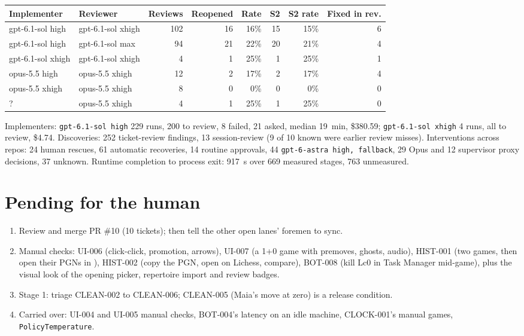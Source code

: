 \documentclass[11pt,a4paper]{article}
\begin{document}
{\small
\begin{tabular}{@{}llrrrrrr@{}}
\toprule
Implementer & Reviewer & Reviews & Reopened & Rate & S2 & S2 rate & Fixed in rev. \\
\midrule
gpt-6.1-sol high & gpt-6.1-sol xhigh & 102 & 16 & 16\% & 15 & 15\% & 6 \\
gpt-6.1-sol high & gpt-6.1-sol max & 94 & 21 & 22\% & 20 & 21\% & 4 \\
gpt-6.1-sol xhigh & gpt-6.1-sol xhigh & 4 & 1 & 25\% & 1 & 25\% & 1 \\
opus-5.5 high & opus-5.5 xhigh & 12 & 2 & 17\% & 2 & 17\% & 4 \\
opus-5.5 xhigh & opus-5.5 xhigh & 8 & 0 & 0\% & 0 & 0\% & 0 \\
? & opus-5.5 xhigh & 4 & 1 & 25\% & 1 & 25\% & 0 \\
\bottomrule
\end{tabular}
}

\medskip
Implementers: \texttt{gpt-6.1-sol high} 229 runs, 200 to review, 8 failed, 21 asked, median
19~min, \$380.59; \texttt{gpt-6.1-sol xhigh} 4 runs, all to review, \$4.74. Discoveries:
252 ticket-review findings, 13 session-review (9 of 10 known were earlier review misses).
Interventions across repos: 24 human rescues, 61 automatic recoveries, 14 routine approvals,
44 \texttt{gpt-6-astra high, fallback}, 29 Opus and 12 supervisor proxy decisions, 37 unknown.
Runtime completion to process exit: 917~s over 669 measured stages, 763 unmeasured.

\section*{Pending for the human}

\begin{enumerate}
  \item Review and merge PR \#10 (10 tickets); then tell the other open lanes' foremen to
        sync.
  \item Manual checks: UI-006 (click-click, promotion, arrows), UI-007 (a 1+0 game with
        premoves, ghosts, audio), HIST-001 (two games, then open their PGNs in
        ), HIST-002 (copy the PGN, open on Lichess, compare), BOT-008
        (kill Lc0 in Task Manager mid-game), plus the visual look of the opening picker,
        repertoire import and review badges.
  \item Stage 1: triage CLEAN-002 to CLEAN-006; CLEAN-005 (Maia's move at zero) is a release
        condition.
  \item Carried over: UI-004 and UI-005 manual checks, BOT-004's latency on an idle machine,
        CLOCK-001's manual games, \texttt{PolicyTemperature}.
\end{enumerate}
\end{document}
